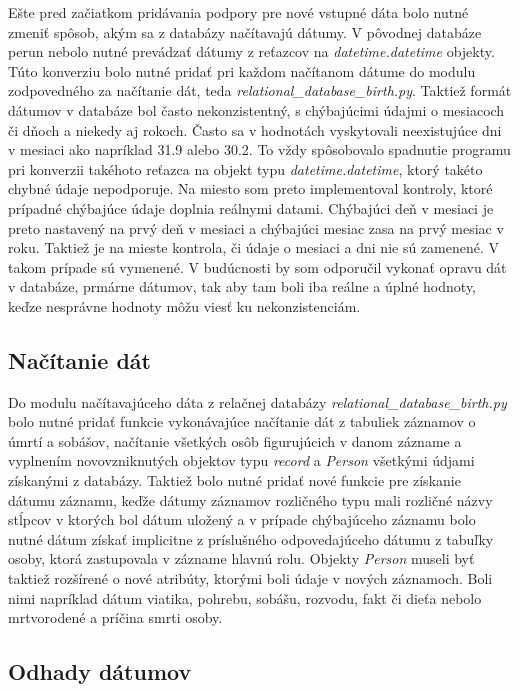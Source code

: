 Ešte pred začiatkom pridávania podpory pre nové vstupné dáta bolo nutné zmeniť spôsob, akým sa z databázy načítavajú dátumy. V pôvodnej databáze perun nebolo nutné prevádzať dátumy z reťazcov na \textit{datetime.datetime} objekty. Túto konverziu bolo nutné pridať pri každom načítanom dátume do modulu zodpovedného za načítanie dát, teda \textit{relational\_database\_birth.py}. Taktiež formát dátumov v databáze bol často nekonzistentný, s chýbajúcimi údajmi o mesiacoch či dňoch a niekedy aj rokoch. Často sa v hodnotách vyskytovali neexistujúce dni v mesiaci ako napríklad 31.9 alebo 30.2. To vždy spôsobovalo spadnutie programu pri konverzii takéhoto reťazca na objekt typu \textit{datetime.datetime}, ktorý takéto chybné údaje nepodporuje. Na miesto som preto implementoval kontroly, ktoré prípadné chýbajúce údaje doplnia reálnymi datami. Chýbajúci deň v mesiaci je preto nastavený na prvý deň v mesiaci a chýbajúci mesiac zasa na prvý mesiac v roku. Taktiež je na mieste kontrola, či údaje o mesiaci a dni nie sú zamenené. V takom prípade sú vymenené. V budúcnosti by som odporučil vykonať opravu dát v databáze, prmárne dátumov, tak aby tam boli iba reálne a úplné hodnoty, keďze nesprávne hodnoty môžu viesť ku nekonzistenciám.

\subsection{Načítanie dát}

Do modulu načítavajúceho dáta z relačnej databázy \textit{relational\_database\_birth.py} bolo nutné pridať funkcie vykonávajúce načítanie dát z tabuliek záznamov o úmrtí a sobášov, načítanie všetkých osôb figurujúcich v danom zázname a vyplnením novovzniknutých objektov typu \textit{record} a \textit{Person} všetkými údjami získanými z databázy. Taktiež bolo nutné pridať nové funkcie pre získanie dátumu záznamu, keďže dátumy záznamov rozličného typu mali rozličné názvy stĺpcov v ktorých bol dátum uložený a v prípade chýbajúceho záznamu bolo nutné dátum získať implicitne z príslušného odpovedajúceho dátumu z tabuľky osoby, ktorá zastupovala v zázname hlavnú rolu. Objekty \textit{Person} museli byť taktiež rozšírené o nové atribúty, ktorými boli údaje v nových záznamoch. Boli nimi napríklad dátum viatika, pohrebu, sobášu, rozvodu, fakt či dieťa nebolo mrtvorodené a príčina smrti osoby.

\subsection{Odhady dátumov}

